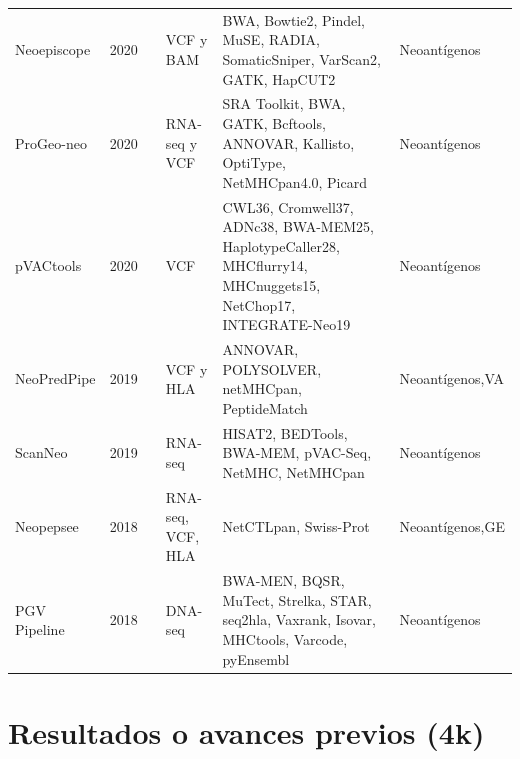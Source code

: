 \documentclass[a4paper,11pt]{article}
\begin{document}
\begin{table}[h]
{{\begin{tabular}{lllp{2cm}p{8.5cm}p{2cm}}
	Neoepiscope     & 2020 &\cite{wood2020neoepiscope}        & VCF y BAM            & BWA, Bowtie2, Pindel, MuSE, RADIA, SomaticSniper, VarScan2, GATK, HapCUT2       & Neoantígenos                          \\
	
	ProGeo-neo      & 2020 &\cite{li2020progeo}               & RNA-seq y VCF           & SRA Toolkit, BWA, GATK, Bcftools, ANNOVAR, Kallisto, OptiType, NetMHCpan4.0, Picard             & Neoantígenos                                       \\
	
	pVACtools       & 2020 &\cite{hundal2020pvactools}        & VCF                                         & CWL36, Cromwell37, ADNc38, BWA-MEM25, HaplotypeCaller28, MHCflurry14, MHCnuggets15, NetChop17, INTEGRATE-Neo19 & Neoantígenos                                       \\
	
	NeoPredPipe     & 2019 &\cite{schenck2019neopredpipe}     & VCF y HLA                & ANNOVAR, POLYSOLVER, netMHCpan, PeptideMatch            & Neoantígenos,VA              \\
	
	ScanNeo         & 2019 &\cite{wang2019scanneo}            & RNA-seq                                                  & HISAT2, BEDTools, BWA-MEM, pVAC-Seq, NetMHC, NetMHCpan & Neoantígenos                                       \\
	
		
	Neopepsee       & 2018 &\cite{kim2018neopepsee}           & RNA-seq, VCF, HLA  & NetCTLpan, Swiss-Prot & Neoantígenos,GE    \\ 
	
	PGV Pipeline    & 2018 &\cite{rubinsteyn2018computational}& DNA-seq                                                  & BWA-MEN, BQSR, MuTect, Strelka, STAR, seq2hla, Vaxrank, Isovar, MHCtools, Varcode, pyEnsembl & Neoantígenos                                       \\
	

\end{tabular}
}	
}
\end{table}




\section{Resultados o avances previos (4k)}
\end{document}
